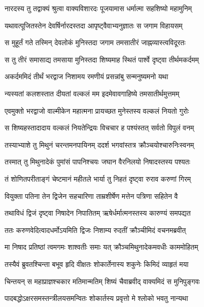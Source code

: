 
\twolineshloka
{नारदस्य तु तद्वाक्यं श्रुत्वा वाक्यविशारदः}
{पूजयामास धर्मात्मा सहशिष्यो महामुनिम्} %

\twolineshloka
{यथावत्पूजितस्तेन देवर्षिर्नारदस्तदा}
{आपृष्ट्वैवाभ्यनुज्ञातः स जगाम विहायसम्} %

\twolineshloka
{स मुहूर्तं गते तस्मिन् देवलोकं मुनिस्तदा}
{जगाम तमसातीरं जाह्नव्यास्त्वविदूरतः} %

\twolineshloka
{स तु तीरं समासाद्य तमसाया मुनिस्तदा}
{शिष्यमाह स्थितं पार्श्वे दृष्ट्वा तीर्थमकर्दमम्} %

\twolineshloka
{अकर्दममिदं तीर्थं भरद्वाज निशामय}
{रमणीयं प्रसन्नांबु सन्मनुष्यमनो यथा} %

\twolineshloka
{न्यस्यतां कलशस्तात दीयतां वल्कलं मम}
{इदमेवावगाहिष्ये तमसातीर्थमुत्तमम्} %

\twolineshloka
{एवमुक्तो भरद्वाजो वाल्मीकेन महात्मना}
{प्रायच्छत मुनेस्तस्य वल्कलं नियतो गुरोः} %

\twolineshloka
{स शिष्यहस्तादादाय वल्कलं नियतेन्द्रियः}
{विचचार ह पश्यंस्तत् सर्वतो विपुलं वनम्} %

\twolineshloka
{तस्याभ्याशे तु मिथुनं चरन्तमनपायिनम्}
{ददर्श भगवांस्तत्र क्रौञ्चयोश्चारुनिःस्वनम्} %

\twolineshloka
{तस्मात् तु मिथुनादेकं पुमांसं पापनिश्चयः}
{जघान वैरनिलयो निषादस्तस्य पश्यतः} %

\twolineshloka
{तं शोणितपरीताङ्गं चेष्टमानं महीतले}
{भार्या तु निहतं दृष्ट्वा रुराव करुणां गिरम्} %

\twolineshloka
{वियुक्ता पतिना तेन द्विजेन सहचारिणा}
{ताम्रशीर्षेण मत्तेन पत्रिणा सहितेन वै} %

\twolineshloka
{तथाविधं द्विजं दृष्ट्वा निषादेन निपातितम्}
{ऋषेर्धर्मात्मनस्तस्य कारुण्यं समपद्यत} %

\twolineshloka
{ततः करुणवेदित्वादधर्मोऽयमिति द्विजः}
{निशाम्य रुदतीं क्रौञ्चीमिदं वचनमब्रवीत्} %

\twolineshloka
{मा निषाद प्रतिष्ठां त्वमगमः शाश्वतीः समाः}
{यत् क्रौञ्चमिथुनादेकमवधीः काममोहितम्} %

\twolineshloka
{तस्यैवं ब्रुवतश्चिन्ता बभूव हृदि वीक्षतः}
{शोकार्तेनास्य शकुनेः किमिदं व्याहृतं मया} %

\twolineshloka
{चिन्तयन् स महाप्राज्ञश्चकार मतिमान्मतिम्}
{शिष्यं चैवाब्रवीद् वाक्यमिदं स मुनिपुङ्गवः} %

\twolineshloka
{पादबद्धोऽक्षरसमस्तन्त्रीलयसमन्वितः}
{शोकार्तस्य प्रवृत्तो मे श्लोको भवतु नान्यथा} %

